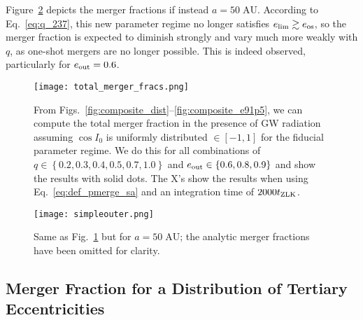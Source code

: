 \documentclass[
        fleqn,
        usenatbib,
    ]{mnras}
\newcommand*{\z}[1]{\left\{#1\right\}}
\begin{document}
Figure~\ref{fig:sweepbin_simpleouter} depicts the merger fractions if instead $a
= 50\;\mathrm{AU}$. According to Eq.~\eqref{eq:q_237}, this new parameter regime
no longer satisfies $e_{\lim} \gtrsim e_{\rm os}$, so the merger fraction is
expected to diminish strongly and vary much more weakly with $q$, as one-shot
mergers are no longer possible. This is indeed observed, particularly for
$e_{\rm out} = 0.6$.

\begin{figure*}
    \centering
    \texttt{[image: total\_merger\_fracs.png]}
    \caption{From Figs.~\ref{fig:composite_dist}--\ref{fig:composite_e91p5}, we
    can compute the total merger fraction in the presence of GW radiation
    assuming $\cos I_0$ is uniformly distributed $\in [-1, 1]$ for the fiducial
    parameter regime. We do this for all combinations of $q \in \z{0.2, 0.3,
    0.4, 0.5, 0.7, 1.0}$ and $e_{\rm out} \in \z{0.6, 0.8, 0.9}$ and show the
    results with solid dots. The X's show the results when using
    Eq.~\eqref{eq:def_pmerge_sa} and an integration time of $2000 t_{\rm ZLK}$.
    }\label{fig:total_merger_fracs}
\end{figure*}
\begin{figure*}
    \centering
    \texttt{[image: simpleouter.png]}
    \caption{Same as Fig.~\ref{fig:total_merger_fracs} but for $a =
    50\;\mathrm{AU}$; the analytic merger fractions have been omitted for
    clarity.
    }\label{fig:sweepbin_simpleouter}
\end{figure*}

\subsection{Merger Fraction for a Distribution of Tertiary Eccentricities}
\end{document}
